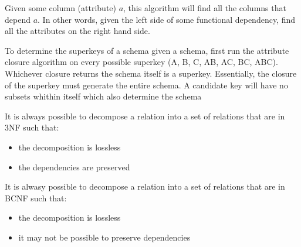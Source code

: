 \documentclass{article}
\begin{document}
Given some column (attribute) $a$, this algorithm will find all the columns that depend $a$. In other words, given the left side of some functional dependency, find all the attributes on the right hand side. 

\begin{remark}
  To determine the superkeys of a schema given a schema, first run the attribute closure algorithm on every possible superkey (A, B, C, AB, AC, BC, ABC). Whichever closure returns the schema itself is a superkey. Essentially, the closure of the superkey must generate the entire schema. A candidate key will have no subsets whithin itself which also determine the schema
\end{remark}

It is always possible to decompose a relation into a set of relations that are in 3NF such that: 
\begin{itemize}
  \item the decomposition is lossless 
  \item the dependencies are preserved
\end{itemize}
It is alwasy possible to decompose a relation into a set of relations that are in BCNF such that: 
\begin{itemize}
  \item the decomposition is lossless 
  \item it may not be possible to preserve dependencies
\end{itemize}
\end{document}
